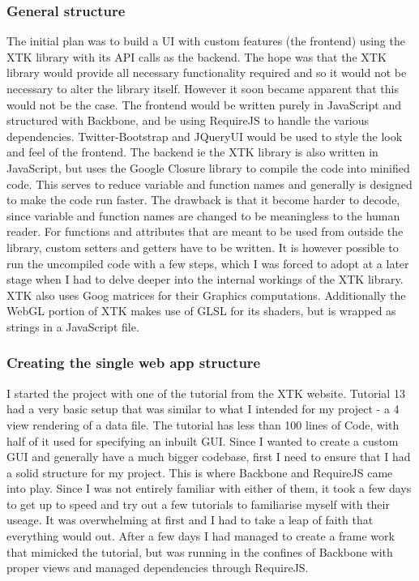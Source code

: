\documentclass[a4paper,11pt,titlepage]{article}
\begin{document}
\subsubsection{General structure}

The initial plan was to build a UI with custom features (the frontend) using the XTK library with its API calls as the backend. The hope was that the XTK library would provide all necessary functionality required and so it would not be necessary to alter the library itself. However it soon became apparent that this would not be the case.
The frontend would be written purely in JavaScript and structured with Backbone, and be using RequireJS to handle the various dependencies. Twitter-Bootstrap and JQueryUI would be used to style the look and feel of the frontend.
The backend ie the XTK library is also written in JavaScript, but uses the Google Closure library to compile the code into minified code. This serves to reduce variable and function names and generally is designed to make the code run faster. The drawback is that it become harder to decode, since variable and function names are changed to be meaningless to the human reader. For functions and attributes that are meant to be used from outside the library, custom setters and getters have to be written. It is however possible to run the uncompiled code with a few steps, which I was forced to adopt at a later stage when I had to delve deeper into the internal workings of the XTK library. XTK also uses Goog matrices for their Graphics computations. Additionally the WebGL portion of XTK makes use of GLSL for its shaders, but is wrapped as strings in a JavaScript file.



\subsubsection{Creating the single web app structure}

I started the project with one of the tutorial from the XTK website. Tutorial 13 had a very basic setup that was similar to what I intended for my project - a 4 view rendering of a data file. The tutorial has less than 100 lines of Code, with half of it used for specifying an inbuilt GUI. Since I wanted to create a custom GUI and generally have a much bigger codebase, first I need to ensure that I had a solid structure for my project. This is where Backbone and RequireJS came into play. Since I was not entirely familiar with either of them, it took a few days to get up to speed and try out a few tutorials to familiarise myself with their useage. It was overwhelming at first and I had to take a leap of faith that everything would out. After a few days I had managed to create a frame work that mimicked the tutorial, but was running in the confines of Backbone with proper views and managed dependencies through RequireJS.
\end{document}
